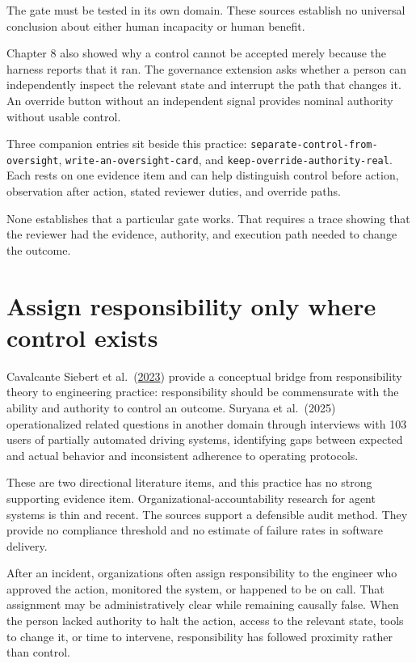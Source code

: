 The gate must be tested in its own domain. These sources establish no universal conclusion about either human incapacity or human benefit.

Chapter 8 also showed why a control cannot be accepted merely because the harness reports that it ran. The governance extension asks whether a person can independently inspect the relevant state and interrupt the path that changes it. An override button without an independent signal provides nominal authority without usable control.

Three companion entries sit beside this practice: \texttt{separate-control-from-oversight}, \texttt{write-an-oversight-card}, and \texttt{keep-override-authority-real}. Each rests on one evidence item and can help distinguish control before action, observation after action, stated reviewer duties, and override paths.

None establishes that a particular gate works. That requires a trace showing that the reviewer had the evidence, authority, and execution path needed to change the outcome.

\hypertarget{assign-responsibility-only-where-control-exists}{%
\section{Assign responsibility only where control exists}\label{assign-responsibility-only-where-control-exists}}

Cavalcante Siebert et al.~(\href{https://arxiv.org/abs/2112.01298}{2023}) provide a conceptual bridge from responsibility theory to engineering practice: responsibility should be commensurate with the ability and authority to control an outcome. Suryana et al.~(2025) operationalized related questions in another domain through interviews with 103 users of partially automated driving systems, identifying gaps between expected and actual behavior and inconsistent adherence to operating protocols.

These are two directional literature items, and this practice has no strong supporting evidence item. Organizational-accountability research for agent systems is thin and recent. The sources support a defensible audit method. They provide no compliance threshold and no estimate of failure rates in software delivery.

After an incident, organizations often assign responsibility to the engineer who approved the action, monitored the system, or happened to be on call. That assignment may be administratively clear while remaining causally false. When the person lacked authority to halt the action, access to the relevant state, tools to change it, or time to intervene, responsibility has followed proximity rather than control.

